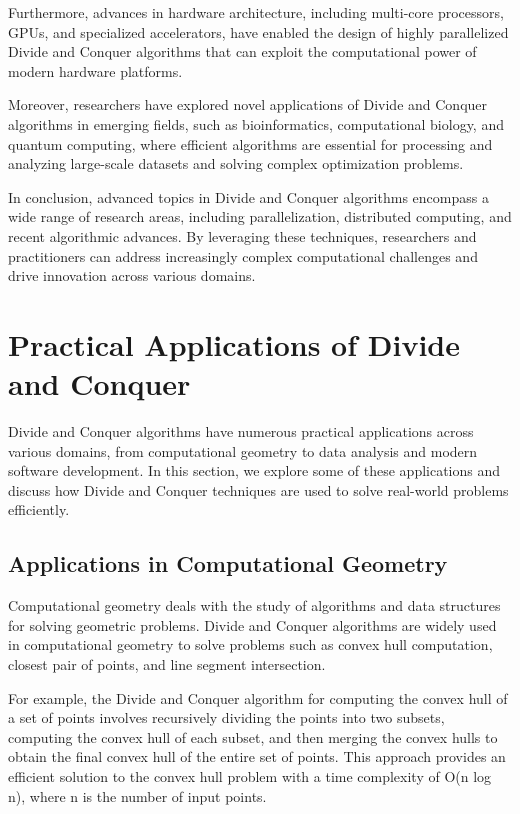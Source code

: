 \documentclass[12pt]{book} %
\begin{document}
Furthermore, advances in hardware architecture, including multi-core processors, GPUs, and specialized accelerators, have enabled the design of highly parallelized Divide and Conquer algorithms that can exploit the computational power of modern hardware platforms.

Moreover, researchers have explored novel applications of Divide and Conquer algorithms in emerging fields, such as bioinformatics, computational biology, and quantum computing, where efficient algorithms are essential for processing and analyzing large-scale datasets and solving complex optimization problems.

In conclusion, advanced topics in Divide and Conquer algorithms encompass a wide range of research areas, including parallelization, distributed computing, and recent algorithmic advances. By leveraging these techniques, researchers and practitioners can address increasingly complex computational challenges and drive innovation across various domains.

\section{Practical Applications of Divide and Conquer}

Divide and Conquer algorithms have numerous practical applications across various domains, from computational geometry to data analysis and modern software development. In this section, we explore some of these applications and discuss how Divide and Conquer techniques are used to solve real-world problems efficiently.

\subsection{Applications in Computational Geometry}

Computational geometry deals with the study of algorithms and data structures for solving geometric problems. Divide and Conquer algorithms are widely used in computational geometry to solve problems such as convex hull computation, closest pair of points, and line segment intersection.

For example, the Divide and Conquer algorithm for computing the convex hull of a set of points involves recursively dividing the points into two subsets, computing the convex hull of each subset, and then merging the convex hulls to obtain the final convex hull of the entire set of points. This approach provides an efficient solution to the convex hull problem with a time complexity of O(n log n), where n is the number of input points.
\end{document}
